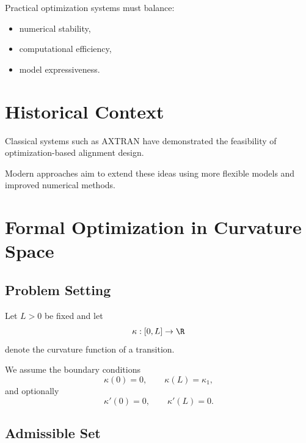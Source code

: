 \begin{remark}
Practical optimization systems must balance:
\begin{itemize}
\item numerical stability,
\item computational efficiency,
\item model expressiveness.
\end{itemize}
\end{remark}


\section{Historical Context}

\begin{remark}
Classical systems such as AXTRAN have demonstrated the feasibility of
optimization-based alignment design.
\end{remark}

\begin{remark}
Modern approaches aim to extend these ideas using more flexible models
and improved numerical methods.
\end{remark}


\section{Formal Optimization in Curvature Space}

\subsection{Problem Setting}

\begin{remark}
Let \(L>0\) be fixed and let
\[
\kappa : [0,L] \to \R
\]
denote the curvature function of a transition.
\end{remark}

\begin{remark}
We assume the boundary conditions
\[
\kappa(0)=0,
\qquad
\kappa(L)=\kappa_1,
\]
and optionally
\[
\kappa'(0)=0,
\qquad
\kappa'(L)=0.
\]
\end{remark}

\subsection{Admissible Set}

